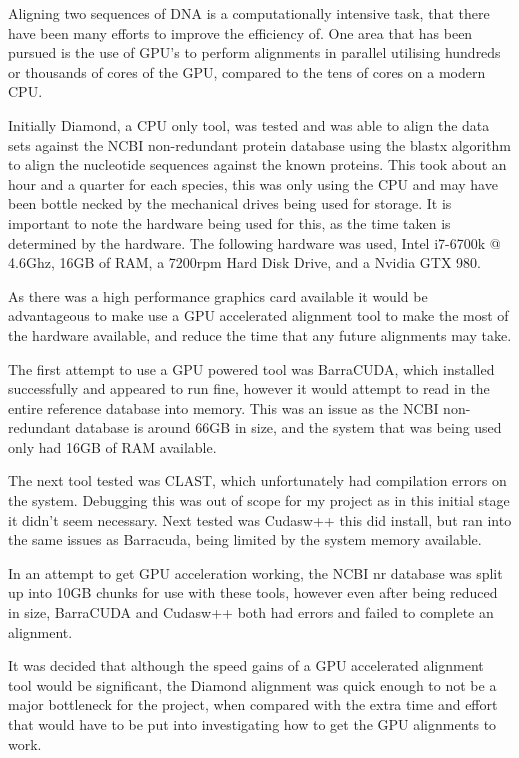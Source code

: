 Aligning two sequences of DNA is a computationally intensive task, that there have been many efforts to improve the efficiency of. One area that has been pursued is the use of GPU's to perform alignments in parallel utilising hundreds or thousands of cores of the GPU, compared to the tens of cores on a modern CPU. 

Initially Diamond\cite{diamond}, a CPU only tool, was tested and was able to align the data sets against the NCBI\cite{ncbi} non-redundant protein database\cite{nr} using the blastx algorithm to align the nucleotide sequences against the known proteins. This took about an hour and a quarter for each species, this was only using the CPU and may have been bottle necked by the mechanical drives being used for storage. It is important to note the hardware being used for this, as the time taken is determined by the hardware. The following hardware was used, Intel i7-6700k @ 4.6Ghz, 16GB of RAM, a 7200rpm Hard Disk Drive, and a Nvidia GTX 980. 

As there was a high performance graphics card available it would be advantageous to make use a GPU accelerated alignment tool to make the most of the hardware available, and reduce the time that any future alignments may take. 

The first attempt to use a GPU powered tool was BarraCUDA\cite{barracuda}, which installed successfully and appeared to run fine, however it would attempt to read in the entire reference database into memory. This was an issue as the NCBI non-redundant database is around 66GB in size, and the system that was being used only had 16GB of RAM available. 

The next tool tested was CLAST\cite{clast}, which unfortunately had compilation errors on the system. Debugging this was out of scope for my project as in this initial stage it didn't seem necessary. Next tested was Cudasw++\cite{cudasw} this did install, but ran into the same issues as Barracuda, being limited by the system memory available. 

In an attempt to get GPU acceleration working, the NCBI nr database was split up into 10GB chunks for use with these tools, however even after being reduced in size, BarraCUDA and Cudasw++ both had errors and failed to complete an alignment. 

It was decided that although the speed gains of a GPU accelerated alignment tool would be significant, the Diamond alignment was quick enough to not be a major bottleneck for the project, when compared with the extra time and effort that would have to be put into investigating how to get the GPU alignments to work. 

